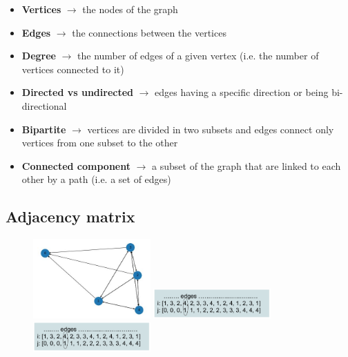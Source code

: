 \begin{tcolorbox}[width=\textwidth,colback={white},title={Some language dictionary },colbacktitle=cyan,coltitle=black]
	\begin{itemize}
		\item \textbf{Vertices} $\rightarrow$ the nodes of the graph
		\item \textbf{Edges} $\rightarrow$ the connections between the vertices
		\item \textbf{Degree} $\rightarrow$ the number of edges of a given vertex (i.e. the number of vertices connected to it)
		\item \textbf{Directed vs undirected} $\rightarrow$ edges having a specific direction or being bi-directional
		\item \textbf{Bipartite} $\rightarrow$ vertices are divided in two subsets and edges connect only
		vertices from one subset to the other
		\item \textbf{Connected component} $\rightarrow$ a subset of the graph that are linked to each other by a path (i.e. a set of edges)
	\end{itemize}
\end{tcolorbox}


\subsection{Adjacency matrix}
\begin{figure}
	\includegraphics[width=0.4\textwidth]{figure_ml/adj_matrix}
	\includegraphics[width=0.4\textwidth]{figure_ml/adj3}
	\includegraphics[width=0.4\textwidth]{figure_ml/adj3}
\end{figure} 

